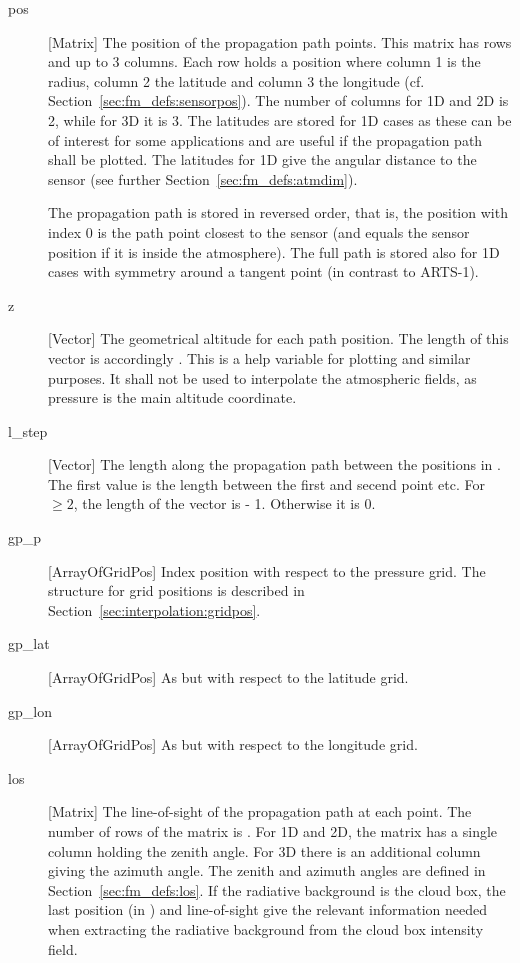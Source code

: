 \begin{description}
   \item[pos] [Matrix] The position of the propagation path points.
     This matrix has  rows and up to 3 columns. Each row
     holds a position where column 1 is the radius, column 2 the
     latitude and column 3 the longitude (cf.
     Section~\ref{sec:fm_defs:sensorpos}). The number of columns for
     1D and 2D is 2, while for 3D it is 3. The latitudes are stored
     for 1D cases as these can be of interest for some applications
     and are useful if the propagation path shall be plotted. The
     latitudes for 1D give the angular distance to the sensor (see
     further Section~\ref{sec:fm_defs:atmdim}).
     
     The propagation path is stored in reversed order, that is, the
     position with index 0 is the path point closest to the sensor
     (and equals the sensor position if it is inside the atmosphere).
     The full path is stored also for 1D cases with symmetry around a
     tangent point (in contrast to ARTS-1). 
     
  \item[z] [Vector] The geometrical altitude for each path position. The
     length of this vector is accordingly . This is a help
     variable for plotting and similar purposes. It shall not be used to
     interpolate the atmospheric fields, as pressure is the main altitude
     coordinate.
     
   \item[l\_step] [Vector] The length along the propagation path
     between the positions in . The first value is the
     length between the first and secend point etc. For 
     $\geq 2$, the length of the vector is  - 1.
     Otherwise it is 0.

   \item[gp\_p] [ArrayOfGridPos] Index position with respect to the
     pressure grid. The structure for grid positions is described in
     Section~\ref{sec:interpolation:gridpos}. 
     
   \item[gp\_lat] [ArrayOfGridPos] As  but with
     respect to the latitude grid.

   \item[gp\_lon] [ArrayOfGridPos] As  but with
     respect to the longitude grid.
     
   \item[los] [Matrix] The line-of-sight of the propagation path at
     each point. The number of rows of the matrix is .
     For 1D and 2D, the matrix has a single column holding the zenith
     angle. For 3D there is an additional column giving the azimuth
     angle. The zenith and azimuth angles are defined in
     Section~\ref{sec:fm_defs:los}. If the radiative background is the
     cloud box, the last position (in ) and
     line-of-sight give the relevant information needed when
     extracting the radiative background from the cloud box intensity
     field.
     

\end{description}
